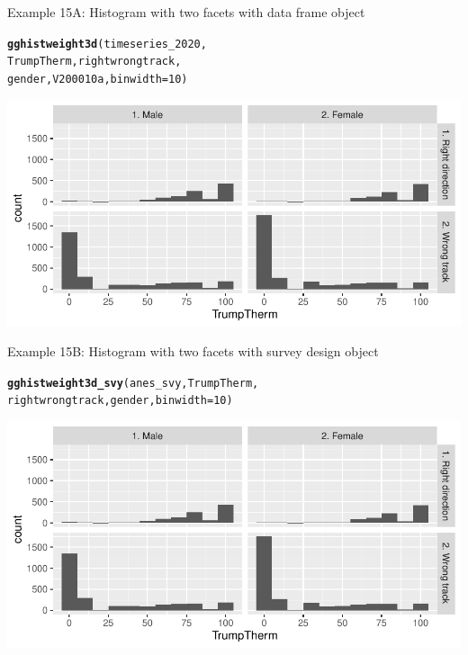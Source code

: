 \documentclass{beamer}\usepackage[]{graphicx}\usepackage[]{xcolor}
\makeatletter
\newcommand{\hlnum}[1]{\textcolor[rgb]{0.686,0.059,0.569}{#1}}%
\newcommand{\hlstd}[1]{\textcolor[rgb]{0.345,0.345,0.345}{#1}}%
\newcommand{\hlkwc}[1]{\textcolor[rgb]{0.333,0.667,0.333}{#1}}%
\newcommand{\hlkwd}[1]{\textcolor[rgb]{0.737,0.353,0.396}{\textbf{#1}}}%
\newenvironment{kframe}{%
 \def\at@end@of@kframe{}%
 \ifinner\ifhmode%
  \def\at@end@of@kframe{\end{minipage}}%
  \begin{minipage}{\columnwidth}%
 \fi\fi%
 \def\FrameCommand##1{\hskip\@totalleftmargin \hskip-\fboxsep
 \colorbox{shadecolor}{##1}\hskip-\fboxsep
     \hskip-\linewidth \hskip-\@totalleftmargin \hskip\columnwidth}%
 \MakeFramed {\advance\hsize-\width
   \@totalleftmargin\z@ \linewidth\hsize
   \@setminipage}}%
 {\par\unskip\endMakeFramed%
 \at@end@of@kframe}
\newenvironment{knitrout}{}{} %
\makeatother
\begin{document}
\begin{frame}[fragile]{Example 15A: Histogram with two facets with data frame object}
\begin{knitrout}
\color{fgcolor}\begin{kframe}
\begin{alltt}
\hlkwd{gghistweight3d}\hlstd{(timeseries_2020,}
    \hlstd{TrumpTherm, rightwrongtrack,}
    \hlstd{gender, V200010a,} \hlkwc{binwidth} \hlstd{=} \hlnum{10}\hlstd{)}
\end{alltt}
\end{kframe}
\includegraphics[width=0.95\linewidth]{figure/unnamed-chunk-77-1} 
\end{knitrout}

\end{frame}

\begin{frame}[fragile]{Example 15B: Histogram with two facets with survey design object}
\begin{knitrout}
\color{fgcolor}\begin{kframe}
\begin{alltt}
\hlkwd{gghistweight3d_svy}\hlstd{(anes_svy, TrumpTherm,}
    \hlstd{rightwrongtrack, gender,} \hlkwc{binwidth} \hlstd{=} \hlnum{10}\hlstd{)}
\end{alltt}
\end{kframe}
\includegraphics[width=0.95\linewidth]{figure/unnamed-chunk-78-1} 
\end{knitrout}

\end{frame}
\end{document}
